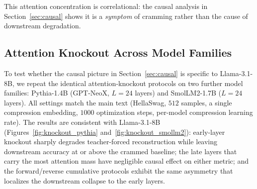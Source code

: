This attention concentration is correlational: the causal analysis in Section~\ref{sec:causal} shows it is a \emph{symptom} of cramming rather than the cause of downstream degradation.

\begin{table}[]
    \centering
    \caption{Attention-concentration summary. ``Compression Embedding'' is attention mass to position 0 for the compression embedding in the crammed input; ``BOS Token'' is attention mass to position 0 for the uncompressed baseline; ``Diff'' is (Compression$-$BOS). ``Correlation'' is the Pearson correlation between per-layer attention-mass profiles.  stands for removed BOS token for cramming compression column.}
    \label{tab:attn_hijacking}
    \begin{small}
    
    \end{small}
\end{table}

\begin{table}[]
    \centering
    \caption{Progressive cramming with and without the BOS token.  denotes runs where the BOS token is removed.}
    \label{tab:progressive_no_bos_token}
    \begin{small}
    
    \end{small}
\end{table}


\subsection{Attention Knockout Across Model Families}
\label{app:knockout_models}

To test whether the causal picture in Section~\ref{sec:causal} is specific to Llama-3.1-8B, we repeat the identical attention-knockout protocols on two further model families: Pythia-1.4B (GPT-NeoX, $L=24$ layers) and SmolLM2-1.7B ($L=24$ layers). All settings match the main text (HellaSwag, $512$ samples, a single compression embedding, $1000$ optimization steps, per-model compression learning rate). The results are consistent with Llama-3.1-8B (Figures~\ref{fig:knockout_pythia} and~\ref{fig:knockout_smollm2}): early-layer knockout sharply degrades teacher-forced reconstruction while leaving downstream accuracy at or above the crammed baseline; the late layers that carry the most attention mass have negligible causal effect on either metric; and the forward/reverse cumulative protocols exhibit the same asymmetry that localizes the downstream collapse to the early layers.

